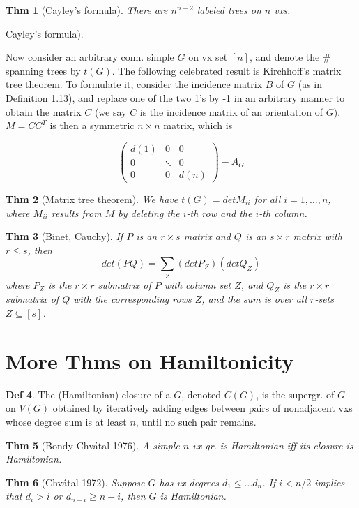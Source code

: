 \documentclass[11pt, fleqn, a4paper, landscape]{article}
\theoremstyle{plain} %
\newtheorem{thm}{Thm}
\theoremstyle{remark} %
\theoremstyle{definition} %
\newtheorem{defi}[thm]{Def}
\begin{document}
\begin{multicols}{5}
\begin{thm}[Cayley's formula]
There are $n^{n-2}$ labeled trees on $n$ vxs.
\end{thm}Cayley’s formula). 

Now consider an arbitrary conn. simple $G$ on vx set $[n]$, and denote the \# spanning trees by $t(G)$. The following celebrated result is Kirchhoff’s matrix tree theorem. To formulate it, consider the incidence matrix $B$ of $G$ (as in Definition 1.13), and replace one of the
two 1’s by -1 in an arbitrary manner to obtain the matrix $C$ (we say $C$ is the incidence matrix of an orientation of $G$). $ M = CC^T$ is then a symmetric $n \times n$ matrix, which is 

\[
\begin{pmatrix}
d(1) & 0 & 0  \\
0 & \ddots & 0  \\
0 & 0 & d(n)  
\end{pmatrix}-A_G\]

\begin{thm}[Matrix tree theorem]
We have $t(G) = det M_{ii}$ for all $i = 1, \dots , n$, where $M_{ii}$ results
from $M$ by deleting the $i$-th row and the $i$-th column.
\end{thm}

\begin{thm}[Binet,  Cauchy]
If $P$ is an $r \times s$ matrix and $Q$ is an $s \times r$ matrix with $r\le s$, then \[det(PQ) =\sum_Z (det P_Z)(detQ_Z)\]
where $P_Z$ is the $r\times r$ submatrix of $P$ with column set $Z$, and $Q_Z$ is the $r\times r$ submatrix of $Q$ with the corresponding rows $Z$, and the sum is over all $r$-sets $Z \subseteq [s]$.
\end{thm}

\addtocounter{subsection}{1}

\section{More Thms on Hamiltonicity}
\begin{defi}
The (Hamiltonian) closure of a $G$, denoted $C(G)$, is the supergr. of $G$ on $V (G)$ obtained by iteratively adding edges between pairs of nonadjacent vxs whose degree sum is at least $n$, until no such pair remains.
\end{defi}
\begin{thm}[Bondy Chvátal 1976]
A simple $n$-vx gr. is Hamiltonian iff its closure is Hamiltonian.
\end{thm}
\begin{thm}[Chvátal 1972]
Suppose $G$ has vx degrees $d_1\le \dots d_n$. If $i < n/2$ implies
that $d_i > i$ or $d_{n-i} \ge n - i$, then $G$ is Hamiltonian.
\end{thm}


\end{multicols}
\end{document}
